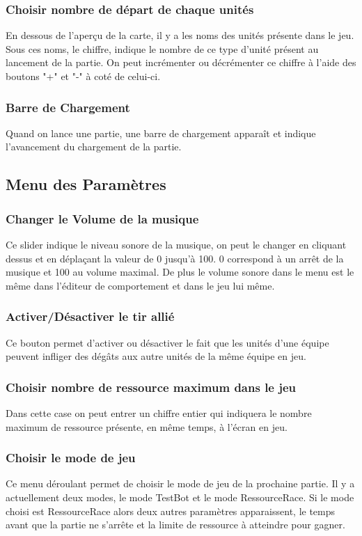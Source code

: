 \documentclass{report}
\begin{document}
\subsubsection{Choisir nombre de départ de chaque unités}
En dessous de l’aperçu de la carte, il y a les noms des unités présente dans le jeu. Sous ces noms, le chiffre, indique le nombre de ce type d'unité présent au lancement de la partie. On peut incrémenter ou décrémenter ce chiffre à l'aide des boutons "+" et "-" à coté de celui-ci.
\subsubsection{Barre de Chargement}
Quand on lance une partie, une barre de chargement apparaît et indique l'avancement du chargement de la partie.

\subsection{Menu des Paramètres}
\subsubsection{Changer le Volume de la musique}
Ce slider indique le niveau sonore de la musique, on peut le changer en cliquant dessus et en déplaçant la valeur de 0 jusqu’à 100. 0 correspond à un arrêt de la musique et 100 au volume maximal. De plus le volume sonore dans le menu est le même dans l'éditeur de comportement et dans le jeu lui même.
\subsubsection{Activer/Désactiver le tir allié}
Ce bouton permet d'activer ou désactiver le fait que les unités d'une équipe peuvent infliger des dégâts aux autre unités de la même équipe en jeu.
\subsubsection{Choisir nombre de ressource maximum dans le jeu}
Dans cette case on peut entrer un chiffre entier qui indiquera le nombre maximum de ressource présente, en même temps, à l'écran en jeu.
\subsubsection{Choisir le mode de jeu}
Ce menu déroulant permet de choisir le mode de jeu de la prochaine partie. Il y a actuellement deux modes, le mode TestBot et le mode RessourceRace. Si le mode choisi est RessourceRace alors deux autres paramètres apparaissent, le temps avant que la partie ne s’arrête et la limite de ressource à atteindre pour gagner.
\end{document}
